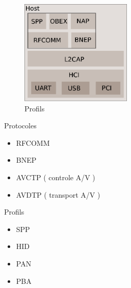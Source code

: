 \begin{frame}
\begin{minipage}[t]{0.60\linewidth}
\begin{figure}
\includegraphics[height=5cm]{arch_log_all.png}
\caption{Profils}
\end{figure}
\end{minipage}
\begin{minipage}[t]{0.38\linewidth}
	\begin{block}{Protocoles}
		\begin{itemize}
			\item RFCOMM
			\item BNEP
			\item AVCTP { \tiny( controle A/V )}
			\item AVDTP { \tiny ( transport  A/V )}
		\end{itemize}
	\end{block}
	\begin{block}{Profils}
		\begin{itemize}
			\item SPP
			\item HID
			\item PAN
			\item PBA
		\end{itemize}
	\end{block}
\end{minipage}


\end{frame}


